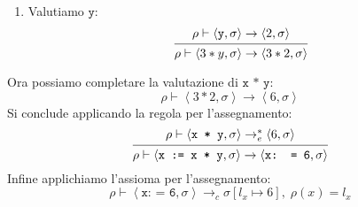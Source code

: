 \documentclass[a4paper]{article}
\begin{document}
\begin{example}
\begin{enumerate}
    \item Valutiamo \( \texttt{y} \):
      \[
        \begin{prooftree}
          \hypo{ 
            \rho \vdash \left< \texttt{y}, \sigma  \right> \to \left< 2, \sigma  \right>
          }
          \infer1{ 
            \rho \vdash \left< 3 * y, \sigma  \right> \to
            \left< 3 * 2, \sigma  \right>
          }
        \end{prooftree}
      \]
  \end{enumerate}
  Ora possiamo completare la valutazione di \( \texttt{x * y} \):
  \[
    \rho  \vdash \left< 3 * 2, \sigma  \right> \to \left< 6, \sigma  \right>
  \] 
  Si conclude applicando la regola per l'assegnamento:
  \[
    \begin{prooftree}
      \hypo{ 
        \rho \vdash \left< \texttt{x * y}, \sigma  \right> \to^*_e \left< 6, \sigma  \right>
      }
      \infer1{ 
        \rho \vdash \left< \texttt{x := x * y}, \sigma  \right>
        \to \left< \texttt{x: = 6}, \sigma  \right>
      }
    \end{prooftree}
  \] 
  Infine applichiamo l'assioma per l'assegnamento:
  \[
    \rho \vdash \left< \texttt{x: = 6}, \sigma  \right> \to_c
    \sigma[l_x \mapsto 6], \; \rho(x) = l_x
  \] 
\end{example}
\end{document}
